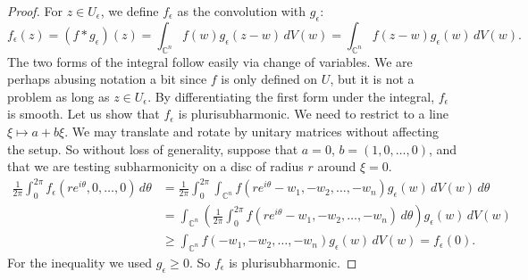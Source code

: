\documentclass[12pt,openany]{book}
\newcommand{\C}{{\mathbb{C}}}
\theoremstyle{plain}
\theoremstyle{remark}
\theoremstyle{definition}
\theoremstyle{exercise}
\theoremstyle{example}
\begin{document}
\begin{proof}
For $z \in U_\epsilon$, we define $f_\epsilon$ as
the convolution with $g_\epsilon$:
\begin{equation*}
f_\epsilon(z) = (f * g_\epsilon)(z) =
\int_{\C^n} f(w) g_\epsilon (z-w) \, dV(w) =
\int_{\C^n} f(z-w) g_\epsilon (w) \, dV(w) .
\end{equation*}
The two forms of the integral follow easily via change of variables.
We are perhaps abusing notation a bit since $f$ is only defined on $U$,
but it is not a problem as long as $z \in
U_\epsilon$.
By differentiating the first form under the integral, $f_\epsilon$ is smooth.
Let us show that $f_\epsilon$ is plurisubharmonic.  We need to restrict to a
line $\xi \mapsto a+b\xi$.
We may translate and rotate by unitary matrices without affecting the setup.
So without loss of generality, suppose that $a = 0$, $b = (1,0,\ldots,0)$,
and that we are testing subharmonicity on a disc of radius $r$ around $\xi = 0$.
\begin{equation*}
\begin{split}
\frac{1}{2\pi} \int_0^{2\pi} f_\epsilon(re^{i\theta},0,\ldots,0)\, d\theta & =
\frac{1}{2\pi} \int_0^{2\pi}
\int_{\C^n}
f(re^{i\theta}-w_1,-w_2,\ldots,-w_n) g_\epsilon (w) \, dV(w) 
\,d\theta
\\
& =
\int_{\C^n}
\left(
\frac{1}{2\pi} \int_0^{2\pi}
f(re^{i\theta}-w_1,-w_2,\ldots,-w_n) \, d\theta \right) g_\epsilon (w) \, dV(w) 
\\
& \geq 
\int_{\C^n}
f(-w_1,-w_2,\ldots,-w_n) g_\epsilon (w) \, dV(w)  = f_\epsilon(0).
\end{split}
\end{equation*}
For the inequality we used $g_\epsilon \geq 0$.
So $f_\epsilon$ is plurisubharmonic.


\end{proof}
\end{document}
